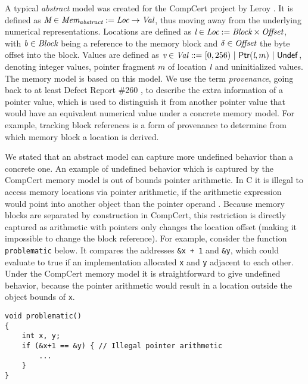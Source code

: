A typical \textit{abstract} model was created for the CompCert project by Leroy \etall \cite{leroy2012compcert}.
It is defined as $\textit{M} \in \textit{Mem}_\textit{abstract} := \textit{Loc} \rightarrow \textit{Val}$, thus moving away from the underlying numerical representations.
Locations are defined as $\textit{l} \in \textit{Loc} := \textit{Block} \times \textit{Offset}$, with $\textit{b} \in \textit{Block}$ being a reference to the memory block and $\delta \in \textit{Offset}$ the byte offset into the block.
Values are defined as $\Valvar \in \Val \ \bnfdef \ [0, 256) \ | \ \mathconstr{Ptr}(\Locvar, m) \ | \ \vundef$, denoting
integer values, pointer fragment $m$ of location $\textit{l}$ and uninitialized values.
The \cink{} memory model is based on this model.
We use the term \textit{provenance}, going back to at least Defect Report \#260 \cite{defect260},
to describe the extra information of a pointer value, which is used to distinguish it from another pointer value that would
have an equivalent numerical value under a concrete memory model.
For example, tracking block references is a form of provenance to determine from which memory block
a location is derived.

We stated that an abstract model can capture more undefined behavior than a concrete one.
An example of undefined behavior which is captured by the CompCert memory model is
out of bounds pointer arithmetic.
In C it is illegal to access memory locations via pointer arithmetic, if the arithmetic expression would point into
another object than the pointer operand \cite[6.5.6]{ISO:2018:III}.
Because memory blocks are separated by construction in CompCert, this restriction is directly captured
as arithmetic with pointers only changes the location offset (making it impossible to change the block reference).
For example, consider the function \texttt{problematic} below.
It compares the addresses \texttt{\&x + 1} and \texttt{\&y}, 
which could evaluate to true if an implementation allocated \texttt{x} and \texttt{y} adjacent to each other.
Under the CompCert memory model it is straightforward to give undefined behavior, because the pointer arithmetic
would result in a location outside the object bounds of \texttt{x}.

\begin{code}
\begin{verbatim}
void problematic()
{
    int x, y;
    if (&x+1 == &y) { // Illegal pointer arithmetic
        ...
    }
}

\end{verbatim}
\end{code}

